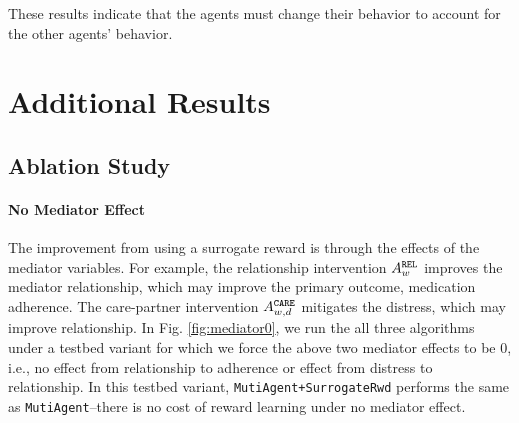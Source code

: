 These results indicate that the agents must change their behavior to account for the other agents' behavior.




\section{Additional Results}

\label{app:additional_results}
\subsection{Ablation Study}

\paragraph{No Mediator Effect} The improvement from using a surrogate reward is through the effects of the mediator variables. For example, the relationship intervention $A_{w}^{\tiny\texttt{REL}}$ improves the mediator relationship, which may improve the primary outcome, medication adherence. The care-partner intervention $A_{w,d}^{\tiny\texttt{CARE}}$ mitigates the distress, which may improve relationship. In Fig. \ref{fig:mediator0}, we run the all three algorithms under a testbed variant for which we force the above two mediator effects to be 0, i.e., no effect from relationship to adherence or effect from distress to relationship. In this testbed variant, \texttt{MutiAgent+SurrogateRwd} performs the same as \texttt{MutiAgent}--there is no cost of reward learning under no mediator effect.

